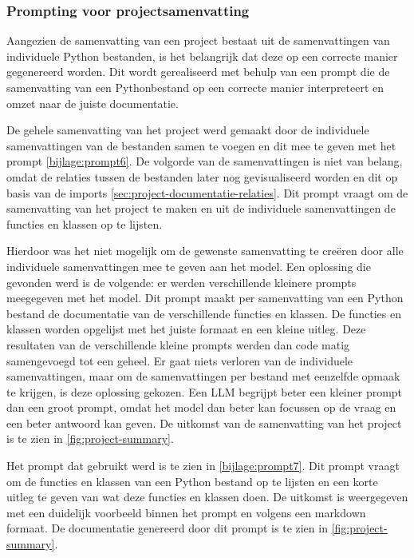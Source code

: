 \subsubsection{Prompting voor projectsamenvatting}
\label{sec:project-documentatie-prompting}

Aangezien de samenvatting van een project bestaat uit de samenvattingen van individuele Python bestanden, is het belangrijk dat deze op een correcte manier gegenereerd worden.
Dit wordt gerealiseerd met behulp van een prompt die de samenvatting van een Pythonbestand op een correcte manier interpreteert en omzet naar de juiste documentatie.

De gehele samenvatting van het project werd gemaakt door de individuele samenvattingen van de bestanden samen te voegen en dit mee te geven met het prompt \ref{bijlage:prompt6}.
De volgorde van de samenvattingen is niet van belang, omdat de relaties tussen de bestanden later nog gevisualiseerd worden en dit op basis van de imports \ref{sec:project-documentatie-relaties}.
Dit prompt vraagt om de samenvatting van het project te maken en uit de individuele samenvattingen de functies en klassen op te lijsten.

Hierdoor was het niet mogelijk om de gewenste samenvatting te creëren door alle individuele samenvattingen mee te geven aan het model.
Een oplossing die gevonden werd is de volgende: er werden verschillende kleinere prompts meegegeven met het model.
Dit prompt maakt per samenvatting van een Python bestand de documentatie van de verschillende functies en klassen. 
De functies en klassen worden opgelijst met het juiste formaat en een kleine uitleg.
Deze resultaten van de verschillende kleine prompts werden dan code matig samengevoegd tot een geheel. 
Er gaat niets verloren van de individuele samenvattingen, maar om de samenvattingen per bestand met eenzelfde opmaak te krijgen, is deze oplossing gekozen.
Een LLM begrijpt beter een kleiner prompt dan een groot prompt, omdat het model dan beter kan focussen op de vraag en een beter antwoord kan geven.
De uitkomst van de samenvatting van het project is te zien in \ref{fig:project-summary}.

Het prompt dat gebruikt werd is te zien in \ref{bijlage:prompt7}.
Dit prompt vraagt om de functies en klassen van een Python bestand op te lijsten en een korte uitleg te geven van wat deze functies en klassen doen.
De uitkomst is weergegeven met een duidelijk voorbeeld binnen het prompt en volgens een markdown formaat. 
De documentatie genereerd door dit prompt is te zien in \ref{fig:project-summary}.


